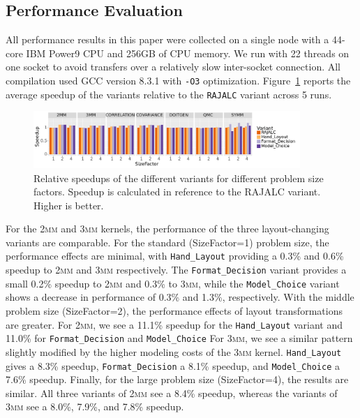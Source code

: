 \documentclass[sigconf,review=true]{acmart}
\begin{document}
\subsection{Performance Evaluation}
All performance results in this paper were collected on a single node with a 44-core IBM Power9 CPU and 256GB of CPU memory. 
We run with 22 threads on one socket to avoid transfers over a relatively slow inter-socket connection.
All compilation used GCC version 8.3.1 with \verb.-O3. optimization.
\label{sec:systemDetails}
Figure~\ref{fig:speedups} reports the average speedup of the variants relative to the \verb.RAJALC. variant across 5 runs. 

\begin{figure}
	\includegraphics[width=0.9\textwidth]{speedups.pdf}
	\caption{Relative speedups of the different variants for different problem size factors. Speedup is calculated in reference to the RAJALC variant. Higher is better.}
	\label{fig:speedups}
\end{figure}

For the \textsc{2mm} and \textsc{3mm} kernels, the performance of the three layout-changing variants are comparable. 
For the standard (SizeFactor=1) problem size, the performance effects are minimal, with \verb.Hand_Layout. providing a 0.3\% and 0.6\% speedup to \textsc{2mm} and \textsc{3mm} respectively. 
The \verb.Format_Decision. variant provides a small 0.2\% speedup to \textsc{2mm} and 0.3\% to \textsc{3mm}, while the \verb.Model_Choice. variant shows a decrease in performance of 0.3\% and 1.3\%, respectively. 
With the middle problem size (SizeFactor=2), the performance effects of layout transformations are greater. 
For \textsc{2mm}, we see a 11.1\% speedup for the \verb.Hand_Layout. variant and 11.0\% for \verb.Format_Decision. and \verb.Model_Choice. 
For \textsc{3mm}, we see a similar pattern slightly modified by the higher modeling costs of the \textsc{3mm} kernel. \verb.Hand_Layout. gives a 8.3\% speedup, \verb.Format_Decision. a 8.1\% speedup, and \verb.Model_Choice. a 7.6\% speedup.
Finally, for the large problem size (SizeFactor=4), the results are similar.
All three variants of \textsc{2mm} see a 8.4\% speedup, whereas the variants of \textsc{3mm} see a 8.0\%, 7.9\%, and 7.8\% speedup.
\end{document}
